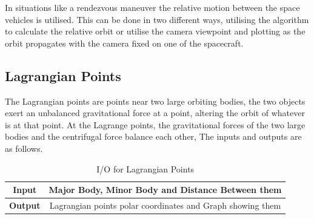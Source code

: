 In situations like a rendezvous maneuver the relative motion between the space vehicles is utilised. This can be done in two different ways, utilising the algorithm to calculate the relative orbit or utilise the camera viewpoint and plotting as the orbit propagates with the camera fixed on one of the spacecraft.
\subsection{Lagrangian Points}
The Lagrangian points are points near two large orbiting bodies, the two objects exert an unbalanced gravitational force at a point, altering the orbit of whatever is at that point. At the Lagrange points, the gravitational forces of the two large bodies and the centrifugal force balance each other, The inputs and outputs are as follows.
\begin{table}[H]
\begin{tabular}{@{}cc@{}}
\toprule
\textbf{Input}  & Major Body, Minor Body and Distance Between them           \\ \midrule
\textbf{Output} & Lagrangian points polar coordinates and Graph showing them \\ \bottomrule
\end{tabular}\caption{I/O for Lagrangian Points}
\end{table}